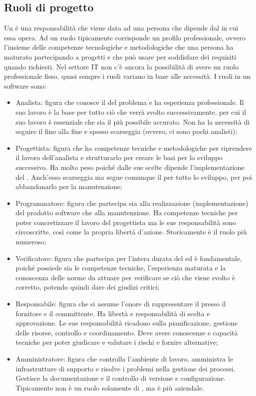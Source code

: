 \documentclass[../main]{subfiles}
\begin{document}
\subsection{Ruoli di progetto}
Un  è una responsabilità che viene data ad una persona che dipende dal  in cui essa opera. Ad un ruolo tipicamente corrisponde un profilo professionale, ovvero l'insieme delle competenze tecnologiche e metodologiche che una persona ha maturato partecipando a progetti e che può usare per soddisfare dei requisiti quando richiesti.\newline
Nel settore IT non c'è ancora la possibilità di avere un ruolo professionale fisso, quasi sempre i ruoli variano in base alle necessità. I ruoli in un  software sono:
\begin{itemize}
    \item Analista: figura che conosce il  del problema e ha esperienza professionale. Il suo lavoro è la base per tutto ciò che verrà svolto successivamente, per cui il suo lavoro è essenziale che sia il più possibile accurato. Non ha la necessità di seguire il  fino alla fine e spesso scarseggia (ovvero, ci sono pochi analisti);
    \item Progettista: figura che ha competenze tecniche e metodologiche per riprendere il lavoro dell'analista e strutturarlo per creare le basi per lo sviluppo successivo. Ha molto peso poiché dalle sue scelte dipende l'implementazione del . Anch'esso scarseggia ma segue comunque il  per tutto lo sviluppo, per poi abbandonarlo per la manutenzione;
    \item Programmatore: figura che partecipa sia alla realizzazione (implementazione) del prodotto software che alla manutenzione. Ha competenze tecniche per poter concretizzare il lavoro del progettista ma le sue responsabilità sono circoscritte, così come la propria libertà d'azione. Storicamente è il ruolo più numeroso;
    \item Verificatore: figura che partecipa per l'intera durata del  ed è fondamentale, poiché possiede sia le competenze tecniche, l'esperienza maturata e la conoscenza delle norme da attuare per verificare se ciò che viene svolto è corretto, potendo quindi dare dei giudizi critici;
    \item Responsabile: figura che si assume l'onore di rappresentare il  presso il fornitore e il committente. Ha libertà e responsabilità di scelta e approvazione. Le sue responsabilità ricadono sulla pianificazione, gestione delle risorse, controllo e coordinamento. Deve avere conoscenze e capacità tecniche per poter giudicare e valutare i rischi e fornire alternative;
    \item Amministratore: figura che controlla l'ambiente di lavoro, amministra le infrastrutture di supporto e risolve i problemi nella gestione dei processi. Gestisce la documentazione e il controllo di versione e configurazione. Tipicamente non è un ruolo solamente di , ma è più aziendale.
\end{itemize}
\end{document}
